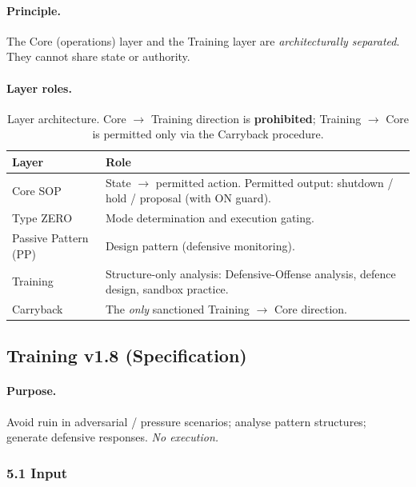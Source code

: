 \paragraph{Principle.}
The Core (operations) layer and the Training layer are
\emph{architecturally separated}. They cannot share state or
authority.

\paragraph{Layer roles.}

\begin{table}[ht]
\centering
\small
\begin{tabularx}{\linewidth}{lX}
\toprule
\textbf{Layer} & \textbf{Role} \\
\midrule
Core SOP & State $\to$ permitted action. Permitted output:
shutdown / hold / proposal (with ON guard). \\
Type ZERO & Mode determination and execution gating. \\
Passive Pattern (PP) & Design pattern (defensive monitoring). \\
Training & Structure-only analysis: Defensive-Offense analysis,
defence design, sandbox practice. \\
Carryback & The \emph{only} sanctioned Training $\to$ Core
direction. \\
\bottomrule
\end{tabularx}
\caption[Defensive-Offense layer architecture]{Layer architecture.
Core $\to$ Training direction is \textbf{prohibited}; Training $\to$
Core is permitted only via the Carryback procedure.}
\label{tab:def-offense-arch}
\end{table}

\subsection{Training v1.8 (Specification)}
\label{sec:training-v18}

\paragraph{Purpose.}
Avoid ruin in adversarial / pressure scenarios; analyse pattern
structures; generate defensive responses. \emph{No execution.}

\subsubsection{5.1 Input}
\label{sec:training-v18-input}

